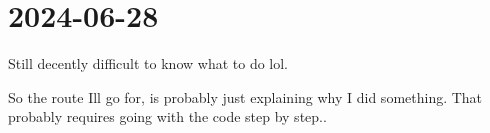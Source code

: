 \section{2024-06-28} %
\label{sec:2024-06-28}

Still decently difficult to know what to do lol. 

So the route Ill go for, is probably just explaining why I did something. That probably requires going with the code step by step..


